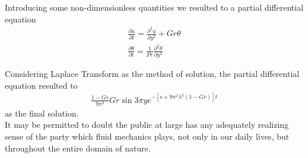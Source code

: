\documentclass[11pt]{report}
\newcommand{\spn}[1]{\\[#1cm]}
\newcommand{\NI}{\noindent}
\newcommand{\Lpt}{Laplace Transform }
\begin{document}
	\NI Introducing some non-dimensionless quantities we resulted to a partial differential equation
	\begin{gather*}
		\frac{\partial u}{\partial t} = \frac{\partial^2 u}{\partial y^2} + Gr\theta\spn{0.5}
		\frac{\partial\theta}{\partial t} = \frac{1}{Pr}\frac{\partial^2\theta}{\partial y^2}
	\end{gather*}
	
	\NI Considering \Lpt as the method of solution, the partial differential equation resulted to
	\begin{eqnarray*}
		\frac{1-Gr}{9\pi^2}Gr\sin3\pi ye^{-\left[s+ 9\pi^2\lambda^2(1-Gr)\right]t}
	\end{eqnarray*}
	as the final solution.\\
	
	\NI It may be permitted to doubt the public at large has any adequately realizing sense of the party which fluid mechanics plays, not only in our daily lives, but throughout the entire domain of nature.
		
	
\end{document}
